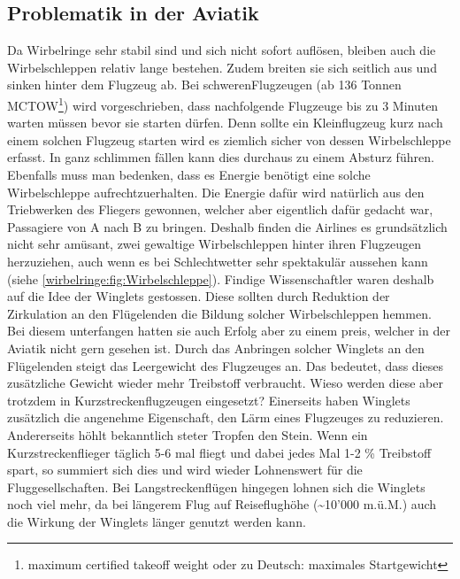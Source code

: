 \subsection{Problematik in der Aviatik}
Da Wirbelringe sehr stabil sind und sich nicht sofort auflösen, bleiben auch die Wirbelschleppen relativ lange bestehen.
Zudem breiten sie sich seitlich aus und sinken hinter dem Flugzeug ab.
Bei \glqq schweren\grqq Flugzeugen (ab 136 Tonnen MCTOW\footnote{maximum certified takeoff weight oder zu Deutsch: maximales Startgewicht}) \cite{Wirbelringe:WakeTurbulence} wird vorgeschrieben, dass nachfolgende Flugzeuge bis zu 3 Minuten warten müssen bevor sie starten dürfen.
Denn sollte ein Kleinflugzeug kurz nach einem solchen Flugzeug starten wird es ziemlich sicher von dessen Wirbelschleppe erfasst.
In ganz schlimmen fällen kann dies durchaus zu einem Absturz führen.
Ebenfalls muss man bedenken, dass es Energie benötigt eine solche Wirbelschleppe aufrechtzuerhalten.
Die Energie dafür wird natürlich aus den Triebwerken des Fliegers gewonnen, welcher aber eigentlich dafür gedacht war, Passagiere von A nach B zu bringen.
Deshalb finden die Airlines es grundsätzlich nicht sehr amüsant, zwei gewaltige Wirbelschleppen hinter ihren Flugzeugen herzuziehen, auch wenn es bei Schlechtwetter sehr spektakulär aussehen kann (siehe \ref{wirbelringe:fig:Wirbelschleppe}). %
Findige Wissenschaftler waren deshalb auf die Idee der Winglets gestossen.
Diese sollten durch Reduktion der Zirkulation an den Flügelenden die Bildung solcher Wirbelschleppen hemmen.
Bei diesem unterfangen hatten sie auch Erfolg aber zu einem preis, welcher in der Aviatik nicht gern gesehen ist.
Durch das Anbringen solcher Winglets an den Flügelenden steigt das Leergewicht des Flugzeuges an.
Das bedeutet, dass dieses zusätzliche Gewicht wieder mehr Treibstoff verbraucht.
Wieso werden diese aber trotzdem in Kurzstreckenflugzeugen eingesetzt?
Einerseits haben Winglets zusätzlich die angenehme Eigenschaft, den Lärm eines Flugzeuges zu reduzieren.
Andererseits höhlt bekanntlich steter Tropfen den Stein.
Wenn ein Kurzstreckenflieger täglich 5-6 mal fliegt und dabei jedes Mal 1-2 \% Treibstoff spart, so summiert sich dies und wird wieder Lohnenswert für die Fluggesellschaften.
Bei Langstreckenflügen hingegen lohnen sich die Winglets noch viel mehr, da bei längerem Flug auf Reiseflughöhe (\textasciitilde10'000 m.ü.M.) auch die Wirkung der Winglets länger genutzt werden kann.
